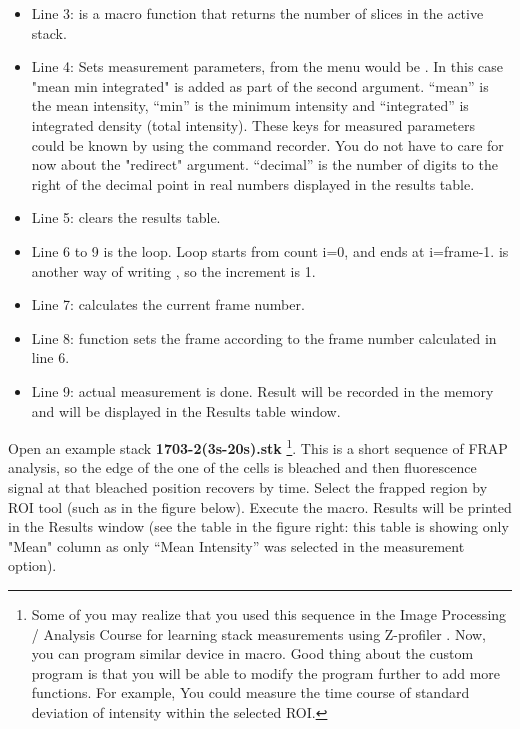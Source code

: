 \begin{itemize}
\item Line 3:  is a macro function that returns the number of slices in the active stack. 

\item Line 4: Sets measurement parameters, from the menu would be . In this case "mean min integrated" is added as part of the second argument. ``mean'' is the mean intensity, ``min'' is the minimum intensity and ``integrated'' is integrated density (total intensity). These keys for measured parameters could be known by using the command recorder. 
You do not have to care for now about the "redirect" argument. ``decimal'' is the number of digits to 
the right of the decimal point in real numbers displayed in the results table. 

\item Line 5: clears the results table. 

\item Line 6 to 9 is the loop. Loop starts from count i=0, and ends at i=frame-1.  is another way of writing , so the increment is 1.  

\item Line 7: calculates the current frame number. 

\item Line 8:  function sets the frame according to the frame number calculated in line 6. 

\item Line 9:  actual measurement is done. 
Result will be recorded in the memory and will be displayed in the Results table window. 
\end{itemize}

Open an example stack \textbf{1703-2(3s-20s).stk}
\footnote{Some of you may realize that you used this sequence 
in the Image Processing / Analysis Course for learning 
stack measurements using Z-profiler . Now, you can program similar 
device in macro. 
Good thing about the custom program
is that you will be able to modify the program further to add more functions.
For example, You could measure the time course of standard deviation of
intensity within the selected ROI.}. This is a short sequence of FRAP analysis,
so the edge of the one of the cells is bleached and then fluorescence signal at that bleached position recovers by time. 
Select the frapped region by ROI tool (such as in the figure below). 
Execute the macro. Results will be printed in the Results window (see the table in the figure right: this table is showing only "Mean" column as only ``Mean Intensity'' was selected in the measurement option). 

